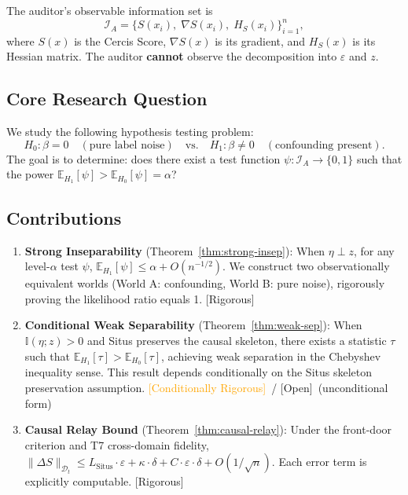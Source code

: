 \documentclass[12pt,a4paper]{article}
\newcommand{\rigorous}{\textcolor{green!50!black}{\small\textsf{[Rigorous]}}}
\newcommand{\conditionallyrigorous}{\textcolor{orange}{\small\textsf{[Conditionally Rigorous]}}}
\newcommand{\openquest}{\textcolor{red!70!black}{\small\textsf{[Open]}}}
\newcommand{\E}{\mathbb{E}}
\newcommand{\I}{\mathbb{I}}
\newcommand{\cD}{\mathcal{D}}
\newcommand{\cI}{\mathcal{I}}
\newcommand{\Situs}{\mathrm{Situs}}
\begin{document}
The auditor's observable information set is
\begin{equation}\label{eq:info-set}
    \cI_A = \{S(x_i),\; \nabla S(x_i),\; H_S(x_i)\}_{i=1}^n,
\end{equation}
where $S(x)$ is the Cercis Score, $\nabla S(x)$ is its gradient, and $H_S(x)$ is its Hessian matrix. The auditor \textbf{cannot} observe the decomposition into $\varepsilon$ and $z$.

\subsection{Core Research Question}

We study the following hypothesis testing problem:
\begin{equation}\label{eq:testing-problem}
    H_0: \beta = 0 \quad (\text{pure label noise})\quad \text{vs.}\quad
    H_1: \beta \neq 0 \quad (\text{confounding present}).
\end{equation}
The goal is to determine: does there exist a test function $\psi: \cI_A \to \{0,1\}$ such that the power $\E_{H_1}[\psi] > \E_{H_0}[\psi] = \alpha$?

\subsection{Contributions}

\begin{enumerate}[label=(\arabic*)]
    \item \textbf{Strong Inseparability} (Theorem~\ref{thm:strong-insep}):
          When $\eta \perp z$, for any level-$\alpha$ test $\psi$,
          $\E_{H_1}[\psi] \leq \alpha + O(n^{-1/2})$.
          We construct two observationally equivalent worlds (World A: confounding, World B: pure noise),
          rigorously proving the likelihood ratio equals 1.
          \rigorous
    \item \textbf{Conditional Weak Separability} (Theorem~\ref{thm:weak-sep}):
          When $\I(\eta;z) > 0$ and Situs preserves the causal skeleton,
          there exists a statistic $\tau$ such that $\E_{H_1}[\tau] > \E_{H_0}[\tau]$,
          achieving weak separation in the Chebyshev inequality sense.
          This result depends conditionally on the Situs skeleton preservation assumption.
          \conditionallyrigorous~/ \openquest~(unconditional form)
    \item \textbf{Causal Relay Bound} (Theorem~\ref{thm:causal-relay}):
          Under the front-door criterion and T7 cross-domain fidelity,
          $\|\Delta S\|_{\cD_t} \leq L_{\Situs}\cdot\varepsilon + \kappa\cdot\delta + C\cdot\varepsilon\cdot\delta + O(1/\sqrt{n})$.
          Each error term is explicitly computable.
          \rigorous
\end{enumerate}
\end{document}
